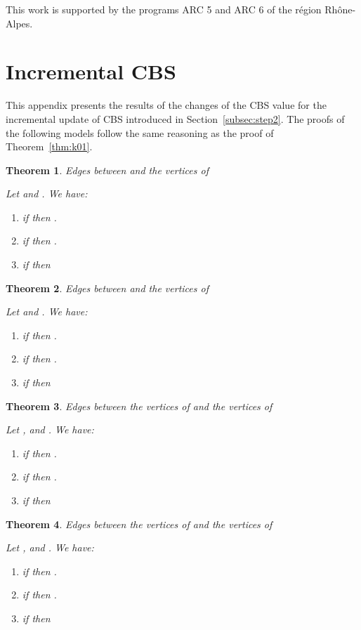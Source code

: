 \documentclass{scrartcl}
\theoremstyle{plain}
\newtheorem{theorem}{Theorem}[section]
\newcommand{\cbs}{CBS}
\begin{document}
This work is supported by the programs ARC 5 and ARC 6 of the r\'egion 
Rh\^one-Alpes. 


\clearpage

\makeatletter{}\appendix


\section{Incremental \cbs}
\label{apdx:theorems}

This appendix presents the results of the changes of the \cbs{} value for the 
incremental update of \cbs{} introduced in Section~\ref{subsec:step2}. The 
proofs of the following models follow the same reasoning as the proof of 
Theorem~\ref{thm:k01}.


\begin{theorem}{Edges between  and the vertices of }

Let  and . We have:
\begin{enumerate}
\item if  then
  .
\item if  then
  .
\item  if  then

\end{enumerate}
\end{theorem}

\begin{theorem}{Edges between  and the vertices of }

Let  and . We have:
\begin{enumerate}
\item if  then
  .
\item if  then
  .
\item  if  then

\end{enumerate}
\end{theorem}

\begin{theorem}{Edges between the vertices of  and the vertices of }

Let ,  and . We have:
\begin{enumerate}
\item if  then
  .
\item if  then
  .
\item  if  then

\end{enumerate}
\end{theorem}

\begin{theorem}{Edges between the vertices of  and the vertices of }

Let ,  and . We have:
\begin{enumerate}
\item if  then
  .
\item if  then
  .
\item  if  then

\end{enumerate}
\end{theorem}
\end{document}
